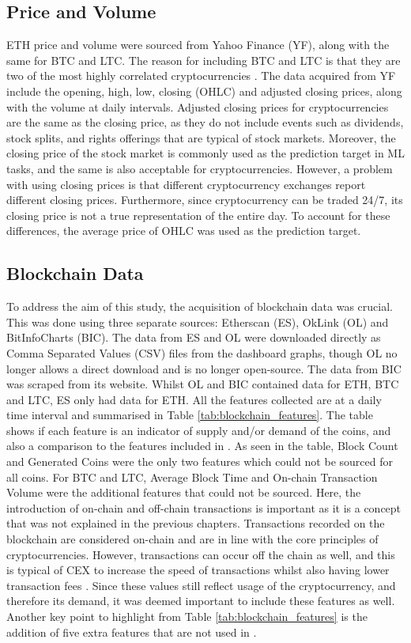 \documentclass[ %
                    author={Raj Dhakan},
                supervisor={Dr. Ayush Joshi},
                    degree={MSc},
                     title={Ethereum Price Prediction using Internal and External Factors},
                  subtitle={},
                      type={},
                      year={2025}]{dissertation}
\begin{document}
\subsection{Price and Volume}
ETH price and volume were sourced from Yahoo Finance (YF), along with the same for BTC and LTC. The reason for including BTC and LTC is that they are two of the most highly correlated cryptocurrencies \cite{seabe2023forecasting, hamayel2021novel}.
The data acquired from YF include the opening, high, low, closing (OHLC) and adjusted closing prices, along with the volume at daily intervals. Adjusted closing prices for cryptocurrencies are the same as the closing price, as they do not include events such as dividends, stock splits, and rights offerings that are typical of stock markets. Moreover, the closing price of the stock market is commonly used as the prediction target in ML tasks, and the same is also acceptable for cryptocurrencies. However, a problem with using closing prices is that different cryptocurrency exchanges report different closing prices. Furthermore, since cryptocurrency can be traded 24/7, its closing price is not a true representation of the entire day. To account for these differences, the average price of OHLC was used as the prediction target.

\subsection{Blockchain Data}
To address the aim of this study, the acquisition of blockchain data was crucial. This was done using three separate sources: Etherscan (ES), OkLink (OL) and BitInfoCharts (BIC). The data from ES and OL were downloaded directly as Comma Separated Values (CSV) files from the dashboard graphs, though OL no longer allows a direct download and is no longer open-source. The data from BIC was scraped from its website. Whilst OL and BIC contained data for ETH, BTC and LTC, ES only had data for ETH. All the features collected are at a daily time interval and summarised in Table \ref{tab:blockchain_features}. The table shows if each feature is an indicator of supply and/or demand of the coins, and also a comparison to the features included in \cite{RN141}. As seen in the table, Block Count and Generated Coins were the only two features which could not be sourced for all coins. For BTC and LTC, Average Block Time and On-chain Transaction Volume were the additional features that could not be sourced. Here, the introduction of on-chain and off-chain transactions is important as it is a concept that was not explained in the previous chapters. Transactions recorded on the blockchain are considered on-chain and are in line with the core principles of cryptocurrencies. However, transactions can occur off the chain as well, and this is typical of CEX to increase the speed of transactions whilst also having lower transaction fees \cite{barbon2021quality}. Since these values still reflect usage of the cryptocurrency, and therefore its demand, it was deemed important to include these features as well. Another key point to highlight from Table \ref{tab:blockchain_features} is the addition of five extra features that are not used in \cite{RN141}.
\end{document}
